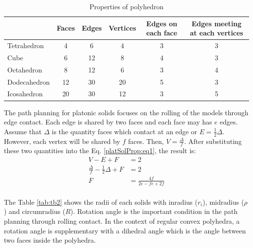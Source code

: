 \begin{table}[H]
\centering
\caption{Properties of polyhedron}
\label{tab:tb1}
\begin{tabular}{|l|c|c|c|c|c|}
\hline
             & Faces & Edges & Vertices & Edges on each face & Edges meeting at each vertices \\ \hline
Tetrahedron  & 4     & 6     & 4        & 3                  & 3                            \\ \hline
Cube         & 6     & 12    & 8        & 4                  & 3                            \\ \hline
Octahedron   & 8     & 12    & 6        & 3                  & 4                            \\ \hline
Dodecahedron & 12    & 30    & 20       & 5                  & 3                            \\ \hline
Icosahedron  & 20    & 30    & 12       & 3                  & 5                            \\ \hline
\end{tabular}
\end{table}
%

\noindent The path planning for platonic solids focuses on the rolling of the models through edge contact. Each edge is shared by two faces and each face may has $e$ edges. Assume that $\Delta $ is the quantity faces which contact at an edge or $E=\frac{1}{2}\Delta $. However, each vertex will be shared by $f$ faces. Then, $V=\frac{\Delta}{f}$. After substituting these two quantities into the Eq. \ref{platSolProp:eq1}, the result is:
%
%
\begin{equation*} 
\label{platSolProp:eq1}
\begin{split}
V-E+F &= 2\\
\frac{\Delta}{f} - \frac{1}{2}\Delta + F &= 2\\
F &= \frac{4f}{2e-fe+2f}\\
\end{split}
\end{equation*}
%

\noindent The Table \ref{tab:tb2} shows the radii of each solids with inradius ($r_i$), midradius ($\rho$) and circumradius ($R$).
Rotation angle is the important condition in the path planning through rolling contact. 
In the context of regular convex polyhedra, a rotation angle is supplementary with a dihedral angle which is the angle between two faces inside the polyhedra.\\

